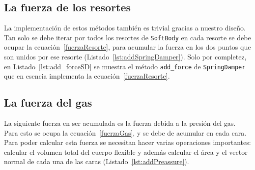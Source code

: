 
\subsection{La fuerza de los resortes}

La implementación de estos métodos también es trivial gracias a nuestro diseño.
Tan solo se debe iterar por todos los resortes de \texttt{SoftBody} en cada resorte se debe ocupar la ecuación~\eqref{fuerzaResorte}, para acumular la fuerza en los dos puntos que son unidos por ese resorte (Listado~\ref{lst:addSpringDamper}).
Solo por completez, en Listado~\ref{lst:add_forceSD} se muestra el método \texttt{add_force} de \texttt{SpringDamper} que en esencia implementa la ecuación~\eqref{fuerzaResorte}.



\subsection{La fuerza del gas}
\label{sec:fuerzaGas}

La siguiente fuerza en ser acumulada es la fuerza debida a la presión del gas. Para esto se ocupa la ecuación~\eqref{fuerzaGas}, y se debe de acumular en cada cara.
Para poder calcular esta fuerza se necesitan hacer varias operaciones importantes: calcular el volumen total del cuerpo flexible y además calcular el área y el vector normal de cada una de las caras (Listado~\ref{lst:addPreassure}).

